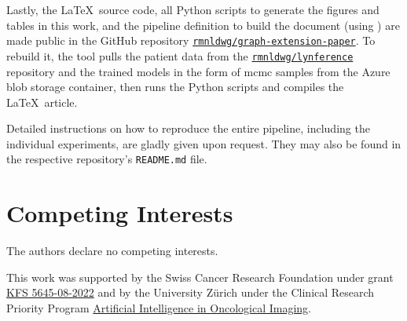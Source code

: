 \documentclass[twocolumn]{aastex631}
\begin{document}
Lastly, the \LaTeX\ source code, all Python scripts to generate the figures and tables in this work, and the pipeline definition to build the document (using \showyourwork \cite{luger_mapping_2021}) are made public in the GitHub repository \href{https://github.com/rmnldwg/graph-extension-paper}{\texttt{rmnldwg/graph-extension-paper}}. To rebuild it, the \showyourwork tool pulls the patient data from the \href{https://github.com/rmnldwg/lynference}{\texttt{rmnldwg/lynference}} repository and the trained models in the form of \gls{mcmc} samples from the Azure blob storage container, then runs the Python scripts and compiles the \LaTeX\ article.

Detailed instructions on how to reproduce the entire pipeline, including the individual experiments, are gladly given upon request. They may also be found in the respective repository's \texttt{README.md} file.


\section*{Competing Interests}

The authors declare no competing interests.


\begin{acknowledgments}

This work was supported by the Swiss Cancer Research Foundation under grant \href{https://www.krebsforschung.ch/unterstuetzen-sie-uns/stiftungen/-dl-/fileadmin/downloads/unterstuetzen-sie-uns/projekte-der-stiftung-krebsforschung-schweiz-2023.pdf}{KFS 5645-08-2022} and by the University Zürich under the Clinical Research Priority Program \href{https://www.crpp-ai-oncology.uzh.ch/en/Projects/Project-5.html}{Artificial Intelligence in Oncological Imaging}.

\end{acknowledgments}

\clearpage


\end{document}
